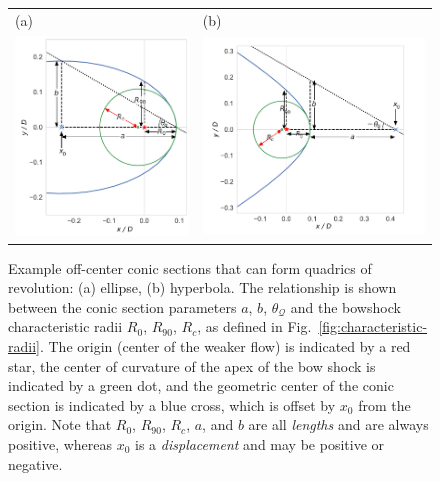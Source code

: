 \newcommand{\Q}{\ensuremath{\mathcal{Q}}}
\newcommand{\thetaQ}{\ensuremath{\theta_{\scriptscriptstyle \Q}}}


\begin{figure}
  \setlength\tabcolsep{2em}
  \begin{tabular}{ll}
    (a) & (b) \\
    \includegraphics[height=0.45\linewidth]{figs/ellipse_edited}
        & \includegraphics[height=0.45\linewidth]{figs/hyperbola_edited}
  \end{tabular}
  \caption{Example off-center conic sections that can form quadrics of
    revolution: (a) ellipse, (b) hyperbola.  The relationship is shown
    between the conic section parameters \(a\), \(b\), \(\thetaQ\) and the
    bowshock characteristic radii \(R_0\), \(R_{90}\), \(R_c\), as
    defined in Fig.~\ref{fig:characteristic-radii}. The origin (center
    of the weaker flow) is indicated by a red star, the center of
    curvature of the apex of the bow shock is indicated by a green
    dot, and the geometric center of the conic section is indicated by
    a blue cross, which is offset by \(x_0\) from the origin.  Note
    that \(R_0\), \(R_{90}\), \(R_c\), \(a\), and \(b\) are all
    \emph{lengths} and are always positive, whereas \(x_0\) is a
    \emph{displacement} and may be positive or negative.}
  \label{fig:conics}
\end{figure}
